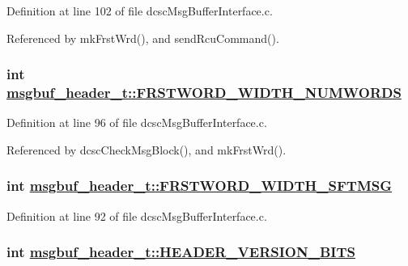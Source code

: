 Definition at line 102 of file dcsc\-Msg\-Buffer\-Interface.c.

Referenced by mk\-Frst\-Wrd(), and send\-Rcu\-Command().\hypertarget{structmsgbuf__header__t_45844eb2528f63b7dbd58f5947794d4b}{
\subsubsection[FRSTWORD\_\-WIDTH\_\-NUMWORDS]{\setlength{\rightskip}{0pt plus 5cm}int \hyperlink{structmsgbuf__header__t_45844eb2528f63b7dbd58f5947794d4b}{msgbuf\_\-header\_\-t::FRSTWORD\_\-WIDTH\_\-NUMWORDS}}}
\label{structmsgbuf__header__t_45844eb2528f63b7dbd58f5947794d4b}




Definition at line 96 of file dcsc\-Msg\-Buffer\-Interface.c.

Referenced by dcsc\-Check\-Msg\-Block(), and mk\-Frst\-Wrd().\hypertarget{structmsgbuf__header__t_87b758b56e97db8198bd7d6405bdb874}{
\subsubsection[FRSTWORD\_\-WIDTH\_\-SFTMSG]{\setlength{\rightskip}{0pt plus 5cm}int \hyperlink{structmsgbuf__header__t_87b758b56e97db8198bd7d6405bdb874}{msgbuf\_\-header\_\-t::FRSTWORD\_\-WIDTH\_\-SFTMSG}}}
\label{structmsgbuf__header__t_87b758b56e97db8198bd7d6405bdb874}




Definition at line 92 of file dcsc\-Msg\-Buffer\-Interface.c.\hypertarget{structmsgbuf__header__t_d576520bf5242643edb45474d294086b}{
\subsubsection[HEADER\_\-VERSION\_\-BITS]{\setlength{\rightskip}{0pt plus 5cm}int \hyperlink{structmsgbuf__header__t_d576520bf5242643edb45474d294086b}{msgbuf\_\-header\_\-t::HEADER\_\-VERSION\_\-BITS}}}
\label{structmsgbuf__header__t_d576520bf5242643edb45474d294086b}




